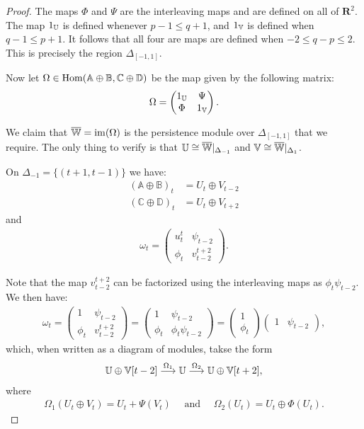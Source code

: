 \begin{proof}
The maps $\Phi$ and $\Psi$ are the interleaving maps and are defined on all of $\mathbf{R}^2$. The map $1_{\mathbb{U}}$ is defined whenever $p-1 \leq q+1$, and $1_{\mathbb{V}}$ is defined when $q-1 \leq p+1$. It follows that all four are maps are defined when $-2 \leq q - p \leq 2$. This is precisely the region $\Delta_{[-1, 1]}$.

Now let $\Omega \in \operatorname{Hom}(\mathbb{A} \oplus \mathbb{B}, \mathbb{C} \oplus \mathbb{D})$ be the map given by the following matrix:
\begin{align*}
\Omega = \begin{pmatrix}
1_{\mathbb{U}} & \Psi \\
\Phi & 1_{\mathbb{V}}
\end{pmatrix}.
\end{align*}

We claim that $\overline{\mathbb{W}} = \operatorname{im}(\Omega)$ is the persistence module over $\Delta_{[-1, 1]}$ that we require. The only thing to verify is that $\mathbb{U} \cong \overline{\mathbb{W}}|_{\Delta_{-1}}$ and $\mathbb{V} \cong \overline{\mathbb{W}}|_{\Delta_1}$.

On $\Delta_{-1} = \{(t+1, t-1)\}$ we have:
\begin{align*}
(\mathbb{A} \oplus \mathbb{B})_t &= U_t \oplus V_{t-2} \\
(\mathbb{C} \oplus \mathbb{D})_t &= U_t \oplus V_{t+2}
\end{align*}
and
\begin{align*}
\omega_t = \begin{pmatrix}
u_t^t & \psi_{t-2} \\
\phi_t & v_{t-2}^{t+2}
\end{pmatrix}.
\end{align*}

Note that the map $v_{t-2}^{t+2}$ can be factorized using the interleaving maps as $\phi_t \psi_{t-2}$. We then have:
\begin{align*}
\omega_t = \begin{pmatrix}
1 & \psi_{t-2} \\
\phi_t & v_{t-2}^{t+2}
\end{pmatrix}
= \begin{pmatrix}
1 & \psi_{t-2} \\
\phi_t & \phi_t \psi_{t-2}
\end{pmatrix}
= \begin{pmatrix}
1 \\ \phi_t
\end{pmatrix} 
\begin{pmatrix}
1 & \psi_{t-2}
\end{pmatrix},
\end{align*}
which, when written as a diagram of modules, takse the form
\begin{align*}
\mathbb{U} \oplus \mathbb{V}[t-2] \overset{\Omega_1}{\longrightarrow} \mathbb{U} \overset{\Omega_2}{\longrightarrow} \mathbb{U} \oplus \mathbb{V}[t+2],
\end{align*}
where
\begin{align*}
\Omega_1(U_t \oplus V_t) = U_t + \Psi(V_t) \quad \text{ and } \quad \Omega_2(U_t) = U_t \oplus \Phi(U_t).
\end{align*}


\end{proof}
